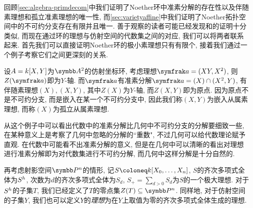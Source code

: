 回顾\ref{sec:algebra-primdecom}中我们证明了Noether环中准素分解的存在性以及伴随素理想和孤立准素理想的唯一性, 而\ref{sec:varietyaffine}中我们证明了Noether拓扑空间中的不可约分支存在有限并且唯一. 善于观察的读者可能已经发现和的证明十分类似, 而现在通过环的理想与仿射空间的代数集之间的对应, 我们可以将两者联系起来. 首先我们可以直接证明Noether环的极小素理想只有有限个\parencite[79, Exercise 7]{atiyah_introduction_1969}, 接着我们通过一个例子考察它们之间更深刻的关系.

\begin{example}\label{exm:primarydecom}
  设$A=k [X, Y]$为$\AF^2$的仿射坐标环, 考虑理想$\ideal{a}=(XY, X^2)$, 则$Z(\ideal{a})$即为$Y$-轴. 而$\ideal{a}$有准素分解$\ideal{a}=(X)\cap (X^2, Y)$, 有伴随素理想$(X), (X, Y)$, 其中$Z(X)$为$Y$-轴, 而$Z(X, Y)$即为原点. 因为原点不是不可约分支, 而是嵌入在某一个不可约分支中, 因此我们称$(X, Y)$为嵌入从属素理想, 而称$(X)$为孤立从属素理想.
\end{example}


从这个例子中可以看出代数中的准素分解比几何中不可约分支的分解要细致一些, 在某种意义上是考察了几何中忽略的分解的``重数", 不过几何可以给代数理论赋予直观. 在代数中可能看不出准素分解的意义, 但是在几何中可以清晰的看出对理想进行准素分解即为对代数集进行不可约分解, 而几何中这样分解是十分自然的.

\bigskip

再考虑射影空间$\PP^n$的情形, 记$S\coloneq \kk [X_0, \dotsc, X_n]$, $S$的齐次多项式全体为$S^h$, 次数为$d$的齐次多项式全体为$S_d$, $S_+=\sum_{d>0}S_d$为$S$的一个极大理想. 对于$S^h$的子集$T$, 我们已经定义了$T$的零点集$Z(T)\subseteq\PP^n$. 同样地, 对于仿射空间的子集$Y$, 我们也可以定义$Y$的\emph{理想}为在$Y$上取值为零的齐次多项式全体生成的理想.

